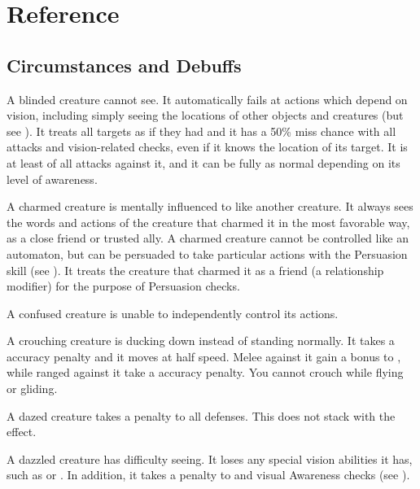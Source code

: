 \chapter{Reference}\label{Reference}

\section{Circumstances and Debuffs}\label{Circumstances and Debuffs}

 A blinded creature cannot see.
It automatically fails at actions which depend on vision, including simply seeing the locations of other objects and creatures (but see ).
It treats all targets as if they had  and it has a 50\% miss chance with all attacks and vision-related checks, even if it knows the location of its target.
It is at least \partiallyunaware of all attacks against it, and it can be fully \unaware as normal depending on its level of awareness.

 A charmed creature is mentally influenced to like another creature.
It always sees the words and actions of the creature that charmed it in the most favorable way, as a close friend or trusted ally.
A charmed creature cannot be controlled like an automaton, but can be persuaded to take particular actions with the Persuasion skill (see ).
It treats the creature that charmed it as a friend (a  relationship modifier) for the purpose of Persuasion checks.

 A confused creature is unable to independently control its actions. \confusionexplanation

 A crouching creature is ducking down instead of standing normally.
It takes a  accuracy penalty and it moves at half speed.
Melee  against it gain a  bonus to , while ranged  against it take a  accuracy penalty.
You cannot crouch while flying or gliding.

 A dazed creature takes a  penalty to all defenses.
This does not stack with the \stunned effect.

 A dazzled creature has difficulty seeing.
It loses any special vision abilities it has, such as  or .
In addition, it takes a  penalty to  and visual Awareness checks (see ).

